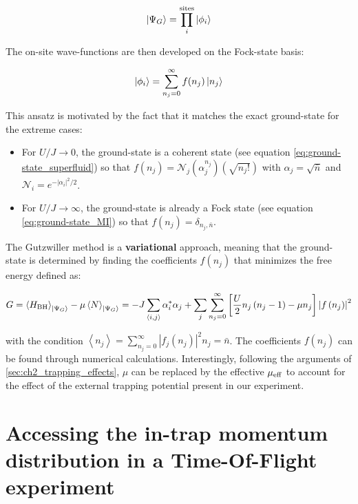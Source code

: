 \begin{equation}
    \ket{\Psi_G} = \prod_i^{\text{sites}} \ket{\phi_i}
\end{equation}

\noindent The on-site wave-functions are then developed on the Fock-state basis:

\begin{equation}
    \ket{\phi_i}= \sum_{n_j=0}^{\infty} f(n_j) \ket{n_j}
\end{equation}

This ansatz is motivated by the fact that it matches the exact ground-state for the extreme cases:

\begin{itemize}
    \item For $U/J \to 0$, the ground-state is a coherent state (see equation \ref{eq:ground-state_superfluid}) so that $f(n_j) = \mathcal{N}_{j}  (\alpha_{j}^{n_{j}})(\sqrt{n_{j} !})$ with $\alpha_j=\sqrt{\bar{n}}$ and $\mathcal{N}_{i}=e^{-\left|\alpha_{i}\right|^{2} / 2}$.
    \item For $U/J \to \infty$, the ground-state is already a Fock state (see equation \ref{eq:ground-state_MI}) so that $f(n_j) = \delta_{n_j,\bar{n}}$.
\end{itemize}

The Gutzwiller method is a \textbf{variational} approach, meaning that the ground-state is determined by finding the coefficients $f(n_j)$ that minimizes the free energy defined as:

\begin{equation}
    G = \left\langle H_{\mathrm{BH}}\right\rangle_{\ket{\Psi_G}} - \mu \left\langle N\right\rangle_{\ket{\Psi_G}} = -J \sum_{\langle i, j\rangle} \alpha_{i}^{*} \alpha_{j}+\sum_{j} \sum_{n_{j}=0}^{\infty}\left[\frac{U}{2} n_{j}\left(n_{j}-1\right)-\mu n_{j}\right]\left|f\left(n_{j}\right)\right|^{2}
\end{equation}

\noindent with the condition $\left\langle n_{j}\right\rangle=\sum_{n_{j}=0}^{\infty}\left|f_{j}\left(n_{j}\right)\right|^{2} n_{j}=\bar{n}$. The coefficients $f(n_j)$ can be found through numerical calculations. Interestingly, following the arguments of \ref{sec:ch2_trapping_effects}, $\mu$ can be replaced by the effective $\mu_{\rm{eff}}$ to account for the effect of the external trapping potential present in our experiment.


\section{Accessing the in-trap momentum distribution in a Time-Of-Flight experiment}

